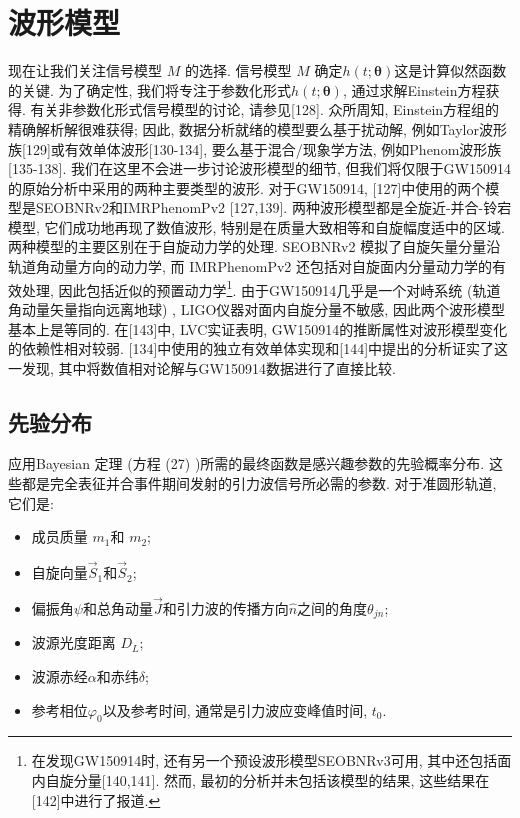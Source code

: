 \documentclass[a4paper]{\documentclassname}
\def\b{\boldsymbol}
\theoremstyle{definition}
\begin{document}
\section{波形模型}

现在让我们关注信号模型 $M$ 的选择. 信号模型 $M$ 确定$h (t;\b{\theta}) $这是计算似然函数的关键. 为了确定性, 我们将专注于参数化形式$h (t;\b{\theta}) $, 通过求解Einstein方程获得. 有关非参数化形式信号模型的讨论, 请参见[128]. 众所周知, Einstein方程组的精确解析解很难获得; 因此, 数据分析就绪的模型要么基于扰动解, 例如Taylor波形族[129]或有效单体波形[130-134], 要么基于混合/现象学方法, 例如Phenom波形族[135-138]. 我们在这里不会进一步讨论波形模型的细节, 但我们将仅限于GW150914的原始分析中采用的两种主要类型的波形. 对于GW150914, [127]中使用的两个模型是SEOBNRv2和IMRPhenomPv2 [127,139].  两种波形模型都是全旋近-并合-铃宕模型, 它们成功地再现了数值波形, 特别是在质量大致相等和自旋幅度适中的区域. 两种模型的主要区别在于自旋动力学的处理. SEOBNRv2 模拟了自旋矢量分量沿轨道角动量方向的动力学, 而 IMRPhenomPv2 还包括对自旋面内分量动力学的有效处理, 因此包括近似的预置动力学\footnote{在发现GW150914时, 还有另一个预设波形模型SEOBNRv3可用, 其中还包括面内自旋分量[140,141].  然而, 最初的分析并未包括该模型的结果, 这些结果在[142]中进行了报道. }. 由于GW150914几乎是一个对峙系统 (轨道角动量矢量指向远离地球) , LIGO仪器对面内自旋分量不敏感, 因此两个波形模型基本上是等同的. 在[143]中, LVC实证表明, GW150914的推断属性对波形模型变化的依赖性相对较弱. [134]中使用的独立有效单体实现和[144]中提出的分析证实了这一发现, 其中将数值相对论解与GW150914数据进行了直接比较. 

\subsection{先验分布}

应用Bayesian 定理 (方程  (27) )所需的最终函数是感兴趣参数的先验概率分布. 这些都是完全表征并合事件期间发射的引力波信号所必需的参数. 对于准圆形轨道, 它们是:
\begin{itemize}
    \item 成员质量 $m_1 $和 $m_2$;
    \item 自旋向量$\vec {S}_1$和$\vec {S}_2$;
    \item 偏振角$\psi$和总角动量$\vec {J}$和引力波的传播方向$\hat{n}$之间的角度$\theta_{jn}$;
    \item 波源光度距离 $D_L$;
    \item 波源赤经$\alpha$和赤纬$\delta$;
    \item 参考相位$\varphi_0$以及参考时间, 通常是引力波应变峰值时间, $t_0$. 
\end{itemize}
\end{document}
